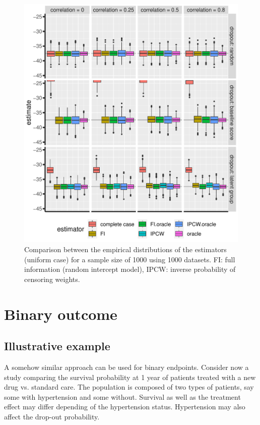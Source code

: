 \documentclass[12pt]{article}
\begin{document}
\begin{figure}[!h]
\centering
\includegraphics[width=\textwidth]{./figures/simStudy-bias-unif.pdf}
\caption{\label{fig:simulationGaussian}Comparison between the empirical distributions of the estimators (uniform case) for a sample size of 1000 using 1000 datasets. FI: full information (random intercept model), IPCW: inverse probability of censoring weights.}
\end{figure}


\clearpage

\section{Binary outcome}
\label{sec:orga607cf2}

\subsection{Illustrative example}
\label{sec:org8103a10}
A somehow similar approach can be used for binary endpoints. Consider
now a study comparing the survival probability at 1 year of patients
treated with a new drug vs. standard care. The population is composed
of two types of patients, say some with hypertension and some
without. Survival as well as the treatment effect may differ depending
of the hypertension status. Hypertension may also affect the drop-out
probability.
\end{document}
